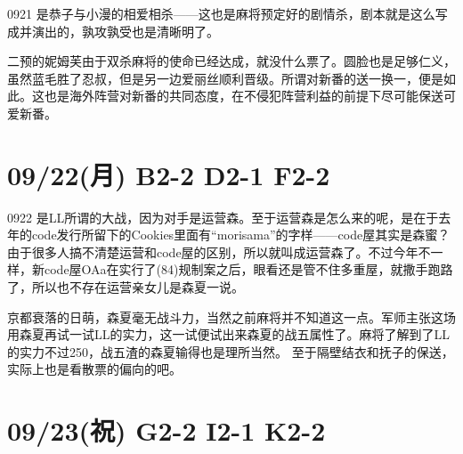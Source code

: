 0921 是恭子与小漫的相爱相杀——这也是麻将预定好的剧情杀，剧本就是这么写成并演出的，孰攻孰受也是清晰明了。

二预的妮姆芙由于双杀麻将的使命已经达成，就没什么票了。圆脸也是足够仁义，虽然蓝毛胜了忍叔，但是另一边爱丽丝顺利晋级。所谓对新番的送一换一，便是如此。这也是海外阵营对新番的共同态度，在不侵犯阵营利益的前提下尽可能保送可爱新番。

\section{09/22(月) B2-2 D2-1 F2-2}


0922 是LL所谓的大战，因为对手是运营森。至于运营森是怎么来的呢，是在于去年的code发行所留下的Cookies里面有“morisama”的字样——code屋其实是森蜜？由于很多人搞不清楚运营和code屋的区别，所以就叫成运营森了。不过今年不一样，新code屋OAa在实行了(84)规制案之后，眼看还是管不住多重屋，就撒手跑路了，所以也不存在运营亲女儿是森夏一说。

京都衰落的日萌，森夏毫无战斗力，当然之前麻将并不知道这一点。军师主张这场用森夏再试一试LL的实力，这一试便试出来森夏的战五属性了。麻将了解到了LL的实力不过250，战五渣的森夏输得也是理所当然。
至于隔壁结衣和抚子的保送，实际上也是看散票的偏向的吧。

\section{09/23(祝) G2-2 I2-1 K2-2}


